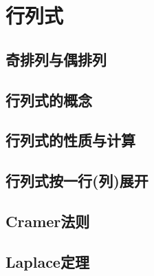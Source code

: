 
\section{行列式}
\label{sec:determinant}

\subsection{奇排列与偶排列}
\label{sec:odd-permutation-and-even-permutation}

\subsection{行列式的概念}
\label{sec:determinant-concept}

\subsection{行列式的性质与计算}
\label{sec:determinant-properties}

\subsection{行列式按一行(列)展开}
\label{sec:determinant-expand-by-row-or-column}

\subsection{Cramer法则}
\label{sec:cramer-rule}

\subsection{Laplace定理}
\label{sec:laplace-theorem}




